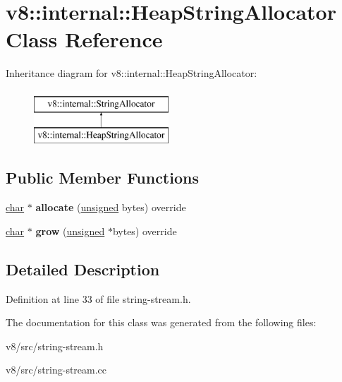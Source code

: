 \hypertarget{classv8_1_1internal_1_1HeapStringAllocator}{}\section{v8\+:\+:internal\+:\+:Heap\+String\+Allocator Class Reference}
\label{classv8_1_1internal_1_1HeapStringAllocator}
Inheritance diagram for v8\+:\+:internal\+:\+:Heap\+String\+Allocator\+:\begin{figure}[H]
\begin{center}
\leavevmode
\includegraphics[height=2.000000cm]{classv8_1_1internal_1_1HeapStringAllocator}
\end{center}
\end{figure}
\subsection*{Public Member Functions}
\begin{DoxyCompactItemize}
\item 
\mbox{\label{classv8_1_1internal_1_1HeapStringAllocator_ada8e942b45db2f819ffb9e3ef587ef1d}} 
\mbox{\hyperlink{classchar}{char}} $\ast$ {\bfseries allocate} (\mbox{\hyperlink{classunsigned}{unsigned}} bytes) override
\item 
\mbox{\label{classv8_1_1internal_1_1HeapStringAllocator_afa64b8cd01c8a9000e09d37865f13bfd}} 
\mbox{\hyperlink{classchar}{char}} $\ast$ {\bfseries grow} (\mbox{\hyperlink{classunsigned}{unsigned}} $\ast$bytes) override
\end{DoxyCompactItemize}


\subsection{Detailed Description}


Definition at line 33 of file string-\/stream.\+h.



The documentation for this class was generated from the following files\+:\begin{DoxyCompactItemize}
\item 
v8/src/string-\/stream.\+h\item 
v8/src/string-\/stream.\+cc\end{DoxyCompactItemize}
